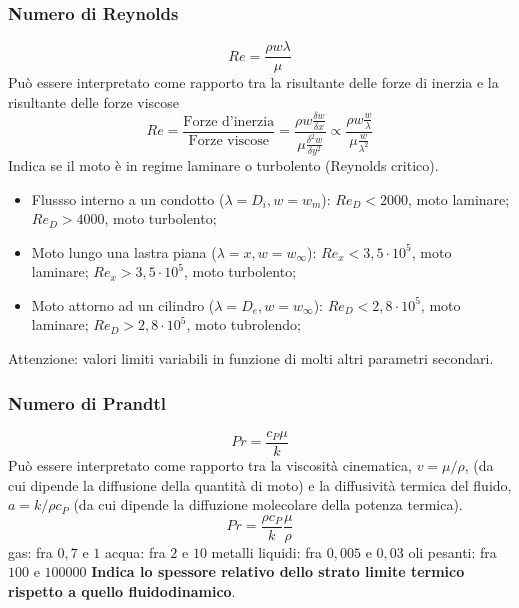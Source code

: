 \subsubsection{Numero di Reynolds}
\[
    Re = \frac{\rho w \lambda}{\mu}
\]
Può essere interpretato come rapporto tra la risultante
delle forze di inerzia e la risultante delle forze viscose
\[
    Re = \frac{\text{Forze d'inerzia}}{\text{Forze viscose}} = \frac{\rho w \frac{\delta w}{\delta x}}{\mu \frac{\delta ^2 w}{\delta y^2}} \propto \frac{\rho w \frac{w}{\lambda}}{\mu \frac{w}{\lambda^2}}
\]
Indica se il moto è in regime laminare o turbolento (Reynolds critico).
\begin{itemize}
    \item Flussso interno a un condotto ($\lambda = D_i, w = w_m$):\newline
    $Re_D < 2000$, moto laminare;\newline
    $Re_D > 4000$, moto turbolento;
    \item Moto lungo una lastra piana ($\lambda = x, w = w_\infty$):\newline
    $Re_x < 3,5 \cdot  10^5$, moto laminare; \newline
    $Re_x > 3,5 \cdot  10^5$, moto turbolento;
    \item Moto attorno ad un cilindro ($\lambda = D_e, w = w_\infty$):\newline
    $Re_D < 2,8 \cdot  10^5$, moto laminare;\newline
    $Re_D > 2,8 \cdot  10^5$, moto tubrolendo;
\end{itemize}
Attenzione: valori limiti variabili in funzione di molti altri parametri secondari.
\subsubsection{Numero di Prandtl}
\[
    Pr = \frac{c_P \mu}{k}
\]
Può essere interpretato come rapporto tra la viscosità cinematica, $v = \mu/\rho$, (da cui dipende la diffusione della quantità di moto) e la diffusività termica del fluido, $a = k / \rho c_P$ (da cui dipende la diffuzione molecolare della potenza termica).
\[
    Pr = \frac{\rho c_P}{k} \frac{\mu}{\rho}
\]
gas: fra $0,7$ e $1$\newline
acqua: fra $2$ e $10$ \newline
metalli liquidi: fra $0,005$ e $0,03$\newline
oli pesanti: fra $100$ e $100000$\newline
\newline
\textbf{Indica lo spessore relativo dello strato limite termico rispetto a quello fluidodinamico}.
